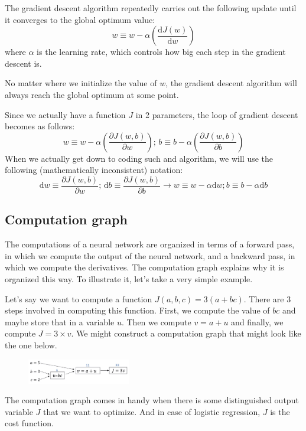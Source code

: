 \documentclass{article}[a4paper,12pt]
\theoremstyle{definition}
\begin{document}
The gradient descent algorithm repeatedly carries out the following update until it converges to the global optimum value:
$$w\equiv w-\alpha\left(\frac{\text{d}J(w)}{\text{d}w}\right)$$
where $\alpha$ is the learning rate, which controls how big each step in the gradient descent is. 
\vspace{6pt}

No matter where we initialize the value of $w$, the gradient descent algorithm will always reach the global optimum at some point. 
\vspace{6pt}

Since we actually have a function $J$ in 2 parameters, the loop of gradient descent becomes as follows:
$$w\equiv w-\alpha\left(\frac{\partial J(w,b)}{\partial w}\right)\text{; } b\equiv b-\alpha\left(\frac{\partial J(w,b)}{\partial b}\right)$$
When we actually get down to coding such and algorithm, we will use the following (mathematically inconsistent) notation:
$$\text{d}w\equiv \frac{\partial J(w,b)}{\partial w} \text{; } \text{d}b\equiv \frac{\partial J(w,b)}{\partial b}\longrightarrow w\equiv w-\alpha\text{d}w; b\equiv b-\alpha\text{d}b$$ 
\subsection{Computation graph}
The computations of a neural network are organized in terms of a forward pass, in which we compute the output of the neural network, and a backward pass, in which we compute the derivatives. The computation graph explains why it is organized this way. To illustrate it, let's take a very simple example.
\vspace{6pt}

Let's say we want to compute a function $J(a,b,c)=3(a+bc)$. There are 3 steps involved in computing this function. First, we compute the value of $bc$ and maybe store that in a variable $u$. Then we compute $v=a+u$ and finally, we compute $J=3\times v$. We might construct a computation graph that might look like the one below.
\begin{figure} \includegraphics[width=0.4\textwidth]{computation_graph.png}
\end{figure}
\vspace{-6pt}

The computation graph comes in handy when there is some distinguished output variable $J$ that we want to optimize. And in case of logistic regression, $J$ is the cost function.
\vspace{6pt}
\end{document}
